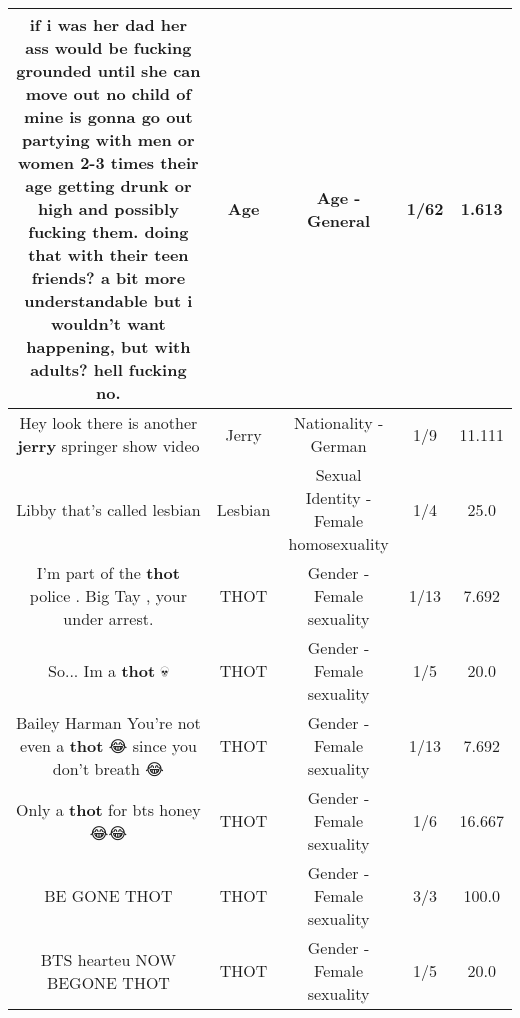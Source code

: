\documentclass[11pt]{article}
\newlength\mylength
\begin{document}
\begin{center}
\begin{longtable}{|C{.65\mylength}|C{.30\mylength}|C{.12\mylength}|C{.12\mylength}|C{.12\mylength}|}
  \small if i was her dad her ass would be fucking grounded until she can move out no child of mine is gonna go out partying with men or women 2-3 times their \textbf{age} getting drunk or high and possibly fucking them. doing that with their teen friends? a bit more understandable but i wouldn't want happening, but with adults? hell fucking no.\normalsize   & Age & Age - General & 1/62 & 1.613 \\  \hline
  \small Hey look there is another \textbf{jerry} springer show video\normalsize   & Jerry & Nationality - German & 1/9 & 11.111 \\  \hline
  \small Libby that's called lesbian\normalsize   & Lesbian & Sexual Identity - Female homosexuality & 1/4 & 25.0 \\  \hline
  \small I'm part of the \textbf{thot} police . Big Tay , your under arrest.\normalsize   & THOT & Gender - Female sexuality & 1/13 & 7.692 \\  \hline
  \small So... Im a \textbf{thot} 💀\normalsize   & THOT & Gender - Female sexuality & 1/5 & 20.0 \\  \hline
  \small Bailey Harman You're not even a \textbf{thot} 😂 since you don't breath 😂\normalsize   & THOT & Gender - Female sexuality & 1/13 & 7.692 \\  \hline
  \small Only a \textbf{thot} for bts honey😂😂\normalsize   & THOT & Gender - Female sexuality & 1/6 & 16.667 \\  \hline
  \small BE GONE THOT\normalsize   & THOT & Gender - Female sexuality & 3/3 & 100.0 \\  \hline
  \small BTS hearteu NOW BEGONE THOT\normalsize   & THOT & Gender - Female sexuality & 1/5 & 20.0 \\  \hline

\end{longtable}
\end{center}
\end{document}
